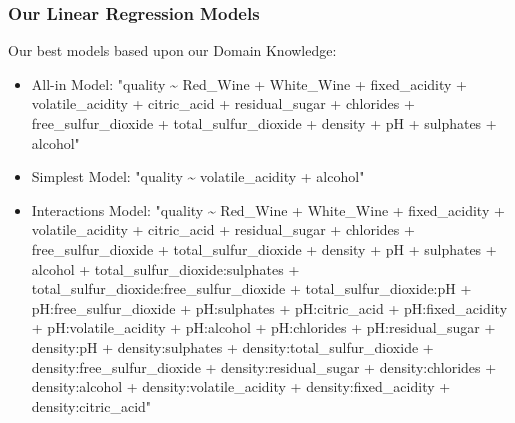 \documentclass{beamer}
\begin{document}
	\begin{frame}
		\frametitle{Our Linear Regression Models}
			Our best models based upon our Domain Knowledge:  \par
			\begin{footnotesize}
			\begin{itemize}
				\item All-in Model:  "quality \~{} Red\_Wine + White\_Wine + fixed\_acidity + volatile\_acidity + citric\_acid + residual\_sugar + chlorides + free\_sulfur\_dioxide + total\_sulfur\_dioxide + density + pH + sulphates + alcohol" 
				\item Simplest Model:  "quality \~{} volatile\_acidity + alcohol"  
				\item Interactions Model:  "quality \~{} Red\_Wine + White\_Wine + fixed\_acidity + volatile\_acidity + citric\_acid + residual\_sugar + chlorides + free\_sulfur\_dioxide + total\_sulfur\_dioxide + density + pH + sulphates + alcohol + total\_sulfur\_dioxide:sulphates + total\_sulfur\_dioxide:free\_sulfur\_dioxide + total\_sulfur\_dioxide:pH + pH:free\_sulfur\_dioxide + pH:sulphates + pH:citric\_acid + pH:fixed\_acidity + pH:volatile\_acidity + pH:alcohol + pH:chlorides + pH:residual\_sugar + density:pH + density:sulphates + density:total\_sulfur\_dioxide + density:free\_sulfur\_dioxide + density:residual\_sugar + density:chlorides + density:alcohol + density:volatile\_acidity + density:fixed\_acidity + density:citric\_acid"
			\end{itemize}
		\end{footnotesize}

	\end{frame}
\end{document}
